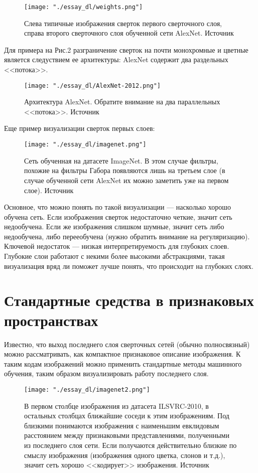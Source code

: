 \documentclass[12pt,fleqn]{article}
\begin{document}
\begin{figure}[H]
\centering
\texttt{[image: "./essay\_dl/weights.png"]}
\caption{Слева типичные изображения сверток первого сверточного слоя, справа второго сверточного слоя обученной сети AlexNet. Источник \cite{CS231N}}
\end{figure}

Для примера на Рис.2 разграничение сверток на почти монохромные и цветные является следуствием ее архитектуры: AlexNet содержит два раздельных <<потока>>.

\begin{figure}[H]
\centering
\texttt{[image: "./essay\_dl/AlexNet-2012.png"]}
\caption{Архитектура AlexNet. Обратите внимание на два параллельных <<потока>>. Источник \cite{AlexNet}}
\end{figure}

Еще пример визуализации сверток первых слоев:
\begin{figure}[H]
\centering
\texttt{[image: "./essay\_dl/imagenet.png"]}
\caption{Сеть обученная на датасете ImageNet. В этом случае фильтры, похожие на фильтры Габора появляются лишь на третьем слое (в случае обученной сети AlexNet их можно заметить уже на первом слое). Источник \cite{ImageNet}}
\end{figure}

Основное, что можно понять по такой визуализации --- насколько хорошо обучена сеть. Если изображения сверток недостаточно четкие, значит сеть недообучена. Если же изображения слишком шумные, значит сеть либо недообучена, либо перееобучена (нужно обратить внимание на регуляризацию). Ключевой недостаток --- низкая интерпретируемость для глубоких слоев. Глубокие слои работают с некими более высокими абстракциями, такая визуализация вряд ли поможет лучше понять, что происходит на глубоких слоях.

\section{Стандартные средства в признаковых пространствах}

Известно, что выход последнего слоя сверточных сетей (обычно полносвязный) можно рассматривать, как компактное признаковое описание изображения. К таким кодам изображений можно применить стандартные методы машинного обучения, таким образом визуализировать работу последнего слоя.

\begin{figure}[H]
\centering
\texttt{[image: "./essay\_dl/imagenet2.png"]}
\caption{В первом столбце изображения из датасета ILSVRC-2010, в остальных столбцах ближайшие соседи к этим изображениям. Под близкими понимаются изображения с наименьшим евклидовым расстоянием между признаковыми представлениями, полученными из последнего слоя сети. Если получаются действительно близкие по смыслу изображения (изображения одного цветка, слонов и т.д.), значит сеть хорошо <<кодирует>> изображения. Источник \cite{ImageNet2}}
\end{figure}
\end{document}
